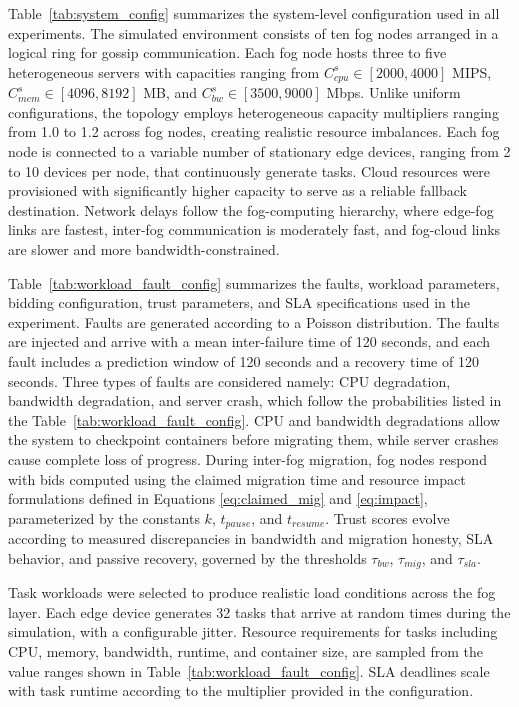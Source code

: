 \documentclass{article}
\begin{document}
Table~\ref{tab:system_config} summarizes the system-level configuration used in all experiments. The simulated environment consists of ten fog nodes arranged in a logical ring for gossip communication. Each fog node hosts three to five heterogeneous servers with capacities ranging from \(C^{s}_{cpu} \in [2000, 4000]\) MIPS, \(C^{s}_{mem} \in [4096, 8192]\) MB, and \(C^{s}_{bw} \in [3500, 9000]\) Mbps. Unlike uniform configurations, the topology employs heterogeneous capacity multipliers ranging from 1.0 to 1.2 across fog nodes, creating realistic resource imbalances. Each fog node is connected to a variable number of stationary edge devices, ranging from 2 to 10 devices per node, that continuously generate tasks. Cloud resources were provisioned with significantly higher capacity to serve as a reliable fallback destination. Network delays follow the fog-computing hierarchy, where edge-fog links are fastest, inter-fog communication is moderately fast, and fog-cloud links are slower and more bandwidth-constrained.

Table~\ref{tab:workload_fault_config} summarizes the faults, workload parameters, bidding configuration, trust parameters, and SLA specifications used in the experiment. Faults are generated according to a Poisson distribution. The faults are injected and arrive with a mean inter-failure time of 120 seconds, and each fault includes a prediction window of 120 seconds and a recovery time of 120 seconds. Three types of faults are considered namely: CPU degradation, bandwidth degradation, and server crash, which follow the probabilities listed in the Table~\ref{tab:workload_fault_config}. CPU and bandwidth degradations allow the system to checkpoint containers before migrating them, while server crashes cause complete loss of progress. During inter-fog migration, fog nodes respond with bids computed using the claimed migration time and resource impact formulations defined in Equations \ref{eq:claimed_mig} and \ref{eq:impact}, parameterized by the constants \(k\), \(t_{pause}\), and \(t_{resume}\). Trust scores evolve according to measured discrepancies in bandwidth and migration honesty, SLA behavior, and passive recovery, governed by the thresholds \(\tau_{bw}\), \(\tau_{mig}\), and \(\tau_{sla}\).

Task workloads were selected to produce realistic load conditions across the fog layer. Each edge device generates 32 tasks that arrive at random times during the simulation, with a configurable jitter. Resource requirements for tasks including CPU, memory, bandwidth, runtime, and container size, are sampled from the value ranges shown in Table~\ref{tab:workload_fault_config}. SLA deadlines scale with task runtime according to the multiplier provided in the configuration.
\end{document}
